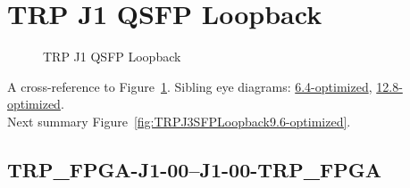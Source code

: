 

% 

\section{TRP J1 QSFP Loopback}\label{sec:TRPJ1QSFPLoopback9.6-optimized}

\begin{figure}[h] %
\begin{subfigure}{0.5\textwidth}
\hyperref[sec:TRPFPGAJ100J100TRPFPGA9.6-optimized]{}
\end{subfigure}\hspace*{\fill}
\begin{subfigure}{0.5\textwidth}
\hyperref[sec:TRPFPGAJ101J101TRPFPGA9.6-optimized]{}
\end{subfigure}

\begin{subfigure}{0.5\textwidth}
\hyperref[sec:TRPFPGAJ102J102TRPFPGA9.6-optimized]{}
\end{subfigure}\hspace*{\fill}
\begin{subfigure}{0.5\textwidth}
\hyperref[sec:TRPFPGAJ103J103TRPFPGA9.6-optimized]{}
\end{subfigure}

\caption{TRP J1 QSFP Loopback} \label{fig:TRPJ1QSFPLoopback9.6-optimized}
\end{figure}

A cross-reference to Figure~\ref{fig:TRPJ1QSFPLoopback9.6-optimized}.
Sibling eye diagrams: \hyperref[sec:TRPJ1QSFPLoopback6.4-optimized]{6.4-optimized}, \hyperref[sec:TRPJ1QSFPLoopback12.8-optimized]{12.8-optimized}. \\
Next summary Figure~\ref{fig:TRPJ3SFPLoopback9.6-optimized}.
\clearpage
% 
\subsection{TRP\_FPGA-J1-00--J1-00-TRP\_FPGA}\label{sec:TRPFPGAJ100J100TRPFPGA9.6-optimized}

